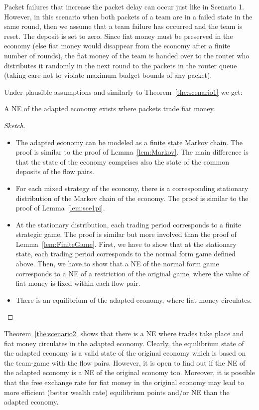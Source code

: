 \documentclass[letterpaper,10pt]{llncs}
\newcommand{\hla}[1]{\hl{#1}}
\renewcommand{\hla}[1]{#1}
\begin{document}
Packet failures that increase the packet delay can occur just like in Scenario 1. 
However, in this scenario when both packets of a team are in a failed state in the same round, 
then we assume that a team failure has occurred and the team is reset. The deposit is set to zero.
Since fiat money must be preserved in the economy (else fiat money would disappear from
the economy after a finite number of rounds), the fiat money of the team is handed
over to the router who distributes it randomly in the next round to the packets in the
router queue (taking care not to violate maximum budget bounds of any packet).

Under plausible assumptions and similarly to Theorem~\ref{the:scenario1} we get:
\begin{theorem}
\label{the:scenario2}
A NE of the adapted economy exists where packets trade fiat money.
\end{theorem}
\begin{proof}[Sketch]
\begin{itemize}
\item The adapted economy can be modeled as a finite state Markov chain. The proof is similar to the proof of Lemma~\ref{lem:Markov}. The main difference is that the state of the economy comprises also the state of the common deposits of the flow pairs.
\item For each mixed strategy of the economy, there is a corresponding stationary distribution of the Markov chain of the economy. The proof is similar to the proof of Lemma~\ref{lem:sce1pi}. 
\item At the stationary distribution, each trading period corresponds to a finite strategic game.
The proof is similar but more involved than the proof of Lemma~\ref{lem:FiniteGame}.
\hla{First, we have to show that at the stationary state, each trading period corresponds to the 
normal form game  defined above. Then, we have to show that a NE of the normal form game 
corresponds to a NE of a restriction of the original game, where the value of fiat money
is fixed within each flow pair.}
\item There is an equilibrium of the adapted economy, where fiat money circulates.
\end{itemize}
\end{proof}

Theorem~\ref{the:scenario2} \hla{shows that there is a NE where trades take place and fiat money 
circulates in the adapted economy. Clearly, the equilibrium state of the adapted economy is 
a valid state of the original economy which is based on the team-game with the flow pairs. 
However, it is open to find out if the NE of the adapted economy is a NE of the original economy too.
Moreover, it is possible that the free exchange rate for fiat money in the original economy may lead to more efficient (better wealth rate) equilibrium points and/or NE than the adapted economy.}
\end{document}
